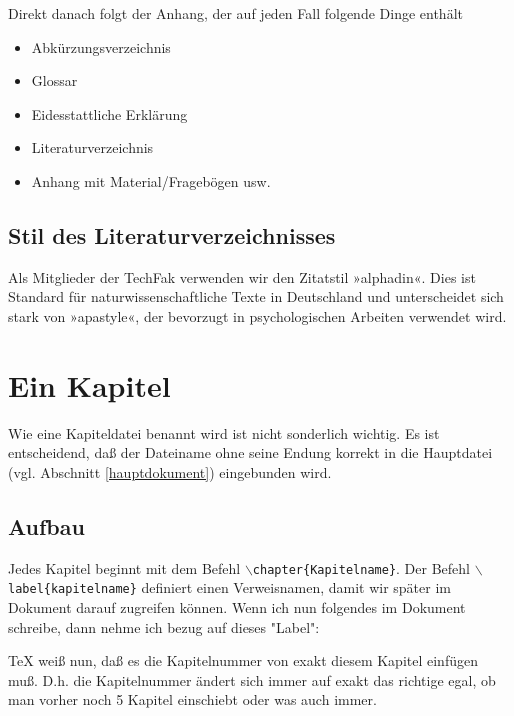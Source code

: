     Direkt danach folgt der Anhang, der auf jeden Fall folgende Dinge enthält
    
    \begin{itemize}
      \item Abkürzungsverzeichnis
      \item Glossar
      \item Eidesstattliche Erklärung
      \item Literaturverzeichnis
      \item Anhang mit Material/Fragebögen usw.
    \end{itemize}
    
    
    \subsection{Stil des Literaturverzeichnisses}
    
    Als Mitglieder der TechFak verwenden wir den Zitatstil »alphadin«. Dies ist Standard für naturwissenschaftliche Texte in Deutschland und unterscheidet sich stark von »apastyle«, der bevorzugt in psychologischen Arbeiten verwendet wird.


  \section{Ein Kapitel}

  Wie eine Kapiteldatei benannt wird ist nicht sonderlich wichtig. Es ist entscheidend, daß der Dateiname ohne seine Endung korrekt in die Hauptdatei (vgl. Abschnitt \ref{hauptdokument}) eingebunden wird.

    \subsection{Aufbau}
    
    Jedes Kapitel beginnt mit dem Befehl \texttt{$\backslash$chapter\{Kapitelname\}}. Der Befehl \texttt{$\backslash$label\{kapitelname\}} definiert einen Verweisnamen, damit wir später im Dokument darauf zugreifen können. Wenn ich nun folgendes im Dokument schreibe, dann nehme ich bezug auf dieses "Label":


    TeX weiß nun, daß es die Kapitelnummer von exakt diesem Kapitel einfügen muß. D.h. die Kapitelnummer ändert sich immer auf exakt das richtige egal, ob man vorher noch 5 Kapitel einschiebt oder was auch immer.
    

